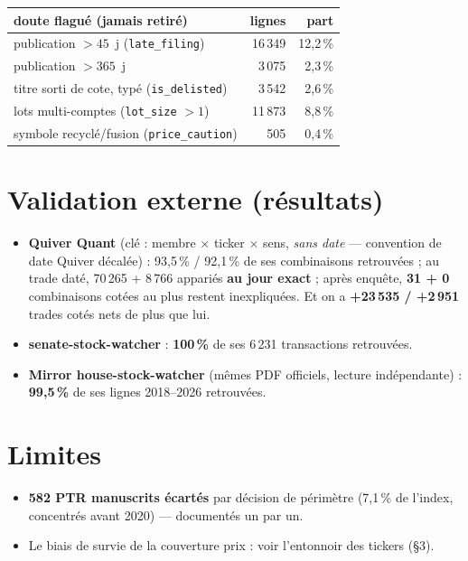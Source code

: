 \documentclass[10pt,a4paper,twocolumn]{article}
\newcommand{\code}[1]{\texttt{\small #1}}
\begin{document}
\begin{center}
\begin{minipage}{\linewidth}\centering\small\setlength{\tabcolsep}{4pt}
\begin{tabular}{lrr}
\toprule
\textbf{doute flagué (jamais retiré)} & \textbf{lignes} & \textbf{part}\\
\midrule
publication $> 45$~j (\code{late\_filing}) & 16\,349 & 12{,}2\,\%\\
publication $> 365$~j                      & 3\,075  & 2{,}3\,\%\\
titre sorti de cote, typé (\code{is\_delisted}) & 3\,542 & 2{,}6\,\%\\
lots multi-comptes (\code{lot\_size} $> 1$) & 11\,873 & 8{,}8\,\%\\
symbole recyclé/fusion (\code{price\_caution}) & 505 & 0{,}4\,\%\\
\bottomrule
\end{tabular}
\end{minipage}
\end{center}

\section{Validation externe (résultats)}
\begin{itemize}
  \item \textbf{Quiver Quant} (clé : membre $\times$ ticker $\times$ sens, \emph{sans date} —
        convention de date Quiver décalée) : 93{,}5\,\% / 92{,}1\,\% de ses combinaisons retrouvées ; au trade daté,
        70\,265 + 8\,766 appariés \textbf{au jour exact} ; après enquête, \textbf{31 + 0} combinaisons
        cotées au plus restent inexpliquées. Et on a \textbf{+23\,535 / +2\,951} trades cotés nets
        de plus que lui.
  \item \textbf{senate-stock-watcher} : \textbf{100\,\%} de ses 6\,231 transactions retrouvées.
  \item \textbf{Mirror house-stock-watcher} (mêmes PDF officiels, lecture indépendante) :
        \textbf{99{,}5\,\%} de ses lignes 2018--2026 retrouvées.
\end{itemize}

\section{Limites}
\begin{itemize}
  \item \textbf{582 PTR manuscrits écartés} par décision de périmètre (7{,}1\,\% de l'index,
        concentrés avant 2020) — documentés un par un.
  \item Le biais de survie de la couverture prix : voir l'entonnoir des tickers (\S3).
\end{itemize}
\end{document}

